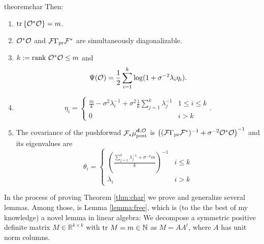 \begin{restatable}{theorem}{char}
  Then:
  \begin{enumerate}
  \item  \(\textup{tr}\left \{\mathcal{O}^*\mathcal{O} \right \} = m\).
  \item \(\mathcal{O}^*\mathcal{O}\) and \(\mathcal{F}\Gamma_{\textup{pr}}\mathcal{F}^*\) are simultaneously
    diagonalizable.
  \item \(k := \textup{rank}\  \mathcal{O}^*\mathcal{O} \leq m\) and
    \begin{equation*}
      \tar(\obs) = \frac12 \sum_{i=1}^{k} \log (1 + \sigma^{-2}\lambda_i\eta_i). %
    \end{equation*}
  \item
    \begin{equation*}
        \eta_i = \begin{cases}
          \frac{m}{k} - \sigma^2 \lambda_i^{-1} + \sigma^2 \frac{1}{k} \sum_{j=1}^k \lambda_j^{-1} & 1 \leq i \leq k \\
          0 & i > k 
        \end{cases}.
    \end{equation*}
  \item The covariance of the pushforwad \(\mathcal{F}_{*} \mu_{\textup{post}}^{\mathbf{d}, \mathcal{O}}\) is \(\left
    ( (\mathcal{F} \Gamma_{\textup{pr}} \mathcal{F}^*)^{-1} + \sigma^{-2} \mathcal{O}^*\mathcal{O} \right
    )^{-1}\) and its eigenvalues are
    \begin{equation*}
      \theta_i =
      \begin{cases}
        \left(\frac{\sum_{j=1}^k \lambda_j^{-1} + \sigma^{-2}m}{k} \right )^{-1} & i \leq k \\
        \lambda_i &  i > k 
      \end{cases}
    \end{equation*}
  \end{enumerate}
\end{restatable}

In the process of proving Theorem \ref{thm:char} we prove and
generalize several lemmas. Among those, is Lemma \ref{lemma:free},
which is (to the the best of my knowledge) a novel lemma in linear
algebra: We decompose a symmetric positive definite matrix \(M \in
\mathbb{R}^{k \times k}\) with \(\textup{tr}\ M = m \in \mathbb{N}\) as \(M =
AA^t\), where \(A\) has unit norm columns.

